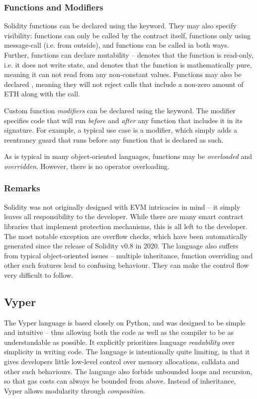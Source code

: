 \subsubsection{Functions and Modifiers}
Solidity functions can be declared using the  keyword. They may also specify visibility:  functions can only be called by the contract itself,  functions only using message-call (i.e. from outside), and  functions can be called in both ways. Further, functions can declare mutability --  denotes that the function is read-only, i.e. it does not write state, and  denotes that the function is mathematically pure, meaning it can not read from any non-constant values. Functions may also be declared , meaning they will not reject calls that include a non-zero amount of ETH along with the call. \par
Custom function \textit{modifiers} can be declared using the  keyword. The modifier specifies code that will run \textit{before} and \textit{after} any function that includes it in its signature. For example, a typical use case is a  modifier, which simply adds a reentrancy guard that runs before any function that is declared as such.
\par
As is typical in many object-oriented languages, functions may be \textit{overloaded} and \textit{overridden}. However, there is no operator overloading.

\subsubsection{Remarks}
Solidity was not originally designed with EVM intricacies in mind -- it simply leaves all responsibility to the developer. While there are many smart contract libraries that implement protection mechanisms, this is all left to the developer. The most notable exception are overflow checks, which have been automatically generated since the release of Solidity v0.8 in 2020. The language also suffers from typical object-oriented issues -- multiple inheritance, function overriding and other such features lead to confusing behaviour. They can make the control flow very difficult to follow.

\subsection{Vyper}
The Vyper language is based closely on Python, and was designed to be simple and intuitive -- thus allowing both the code as well as the compiler to be as understandable as possible. It explicitly prioritizes language \textit{readability} over simplicity in writing code. The language is intentionally quite limiting, in that it gives developers little low-level control over memory allocations, calldata and other such behaviours. The language also forbids unbounded loops and recursion, so that gas costs can always be bounded from above. Instead of inheritance, Vyper allows modularity through \textit{composition}.
